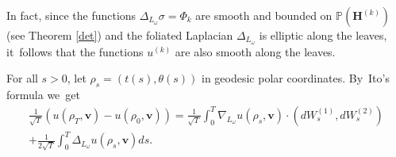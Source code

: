 \documentclass[10pt]{amsart}
\theoremstyle{plain}
\theoremstyle{definition}
\numberwithin{equation}{subsection}
\newcommand\bP{\mathbb{P}}
\let\gradient\nabla
\let\laplacian\Delta
\newcommand{\bfH}{\boldsymbol{H}}
\newcommand{\bfv}{\boldsymbol{v}}
\begin{document}
In fact, since the functions $\laplacian_{L_\omega} \sigma = \Phi_k$ are smooth and bounded on $\bP(\bfH^{(k)})$ (see Theorem \ref{det}) and the foliated Laplacian $\laplacian_{L_\omega}$ is elliptic along the leaves, it~follows that the functions $u^{(k)}$ are also smooth along the leaves.

For all $s>0$, let $\rho_s = (t(s), \theta(s))$ in geodesic polar coordinates. By~Ito's formula we~get\vspace*{-5pt}
\begin{multline*}
\frac{1}{\sqrt{T}}(u(\rho_T,\bfv)-u(\rho_0,\bfv)) = \frac{1}{\sqrt{T}}\int_0^T \gradient_{L_\omega} u(\rho_s,\bfv) \cdot (dW^{(1)}_s,dW^{(2)}_s) \\[-5pt]
+ \frac{1}{2\sqrt{T}} \int_0^T \laplacian_{L_\omega} u(\rho_s, \bfv) ds.
\end{multline*}
\end{document}
